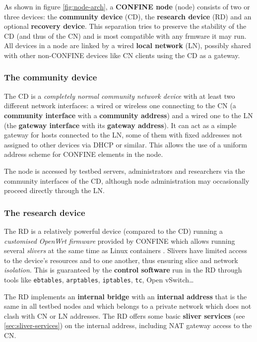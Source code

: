 \documentclass[conference]{IEEEtran}
\begin{document}
As shown in figure \ref{fig:node-arch}, a \textbf{CONFINE node} (node)
consists of two or three devices: the \textbf{community device} (CD), the
\textbf{research device} (RD) and an optional \textbf{recovery device}.  This
separation tries to preserve the stability of the CD (and thus of the CN) and
is most compatible with any frmware it may run.  All devices in a node are
linked by a wired \textbf{local network} (LN), possibly shared with other
non-CONFINE devices like CN clients using the CD as a gateway.

\subsubsection{The community device}

The CD is a \emph{completely normal community network device} with at least
two different network interfaces: a wired or wireless one connecting to the CN
(a \textbf{community interface} with a \textbf{community address}) and a wired
one to the LN (the \textbf{gateway interface} with its \textbf{gateway
  address}).  It can act as a simple gateway for hosts connected to the LN,
some of them with fixed addresses not assigned to other devices via DHCP or
similar.  This allows the use of a uniform address scheme for CONFINE elements
in the node.

The node is accessed by testbed servers, administrators and researchers via
the community interfaces of the CD, although node administration may
occasionally proceed directly through the LN.

\subsubsection{The research device}

The RD is a relatively powerful device (compared to the CD) running a
\emph{customised OpenWrt firmware} provided by CONFINE which allows running
several \emph{slivers} at the same time as Linux containers \cite{lxc}.
Slivers have limited access to the device's resources and to one another, thus
ensuring slice and network \emph{isolation}.  This is guaranteed by the
\textbf{control software} run in the RD through tools like \texttt{ebtables},
\texttt{arptables}, \texttt{iptables}, \texttt{tc}, Open vSwitch…


The RD implements an \textbf{internal bridge} with an \textbf{internal
  address} that is the same in all testbed nodes and which belongs to a
private network which does not clash with CN or LN addresses.  The RD offers
some basic \textbf{sliver services} (see \ref{sec:sliver-services}) on the
internal address, including NAT gateway access to the CN.
\end{document}
